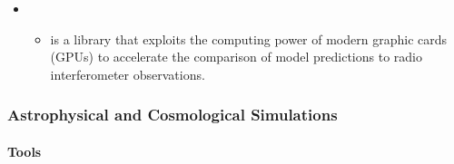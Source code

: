 \documentclass[letterpaper,10pt,english]{sphinxmanual}
\begin{document}
\begin{itemize}
\begin{itemize}
\end{itemize}

\item {} 
\begin{itemize}
\item {} 
 is a library that exploits the computing power of
modern graphic cards (GPUs) to accelerate the comparison of model
predictions to radio interferometer observations.

\end{itemize}

\end{itemize}


\subsubsection{Astrophysical and Cosmological Simulations}
\label{\detokenize{resource/astro/topics/simulations:astrophysical-and-cosmological-simulations}}\label{\detokenize{resource/astro/topics/simulations::doc}}

\paragraph{Tools}
\label{\detokenize{resource/astro/topics/simulations:tools}}
\end{document}
